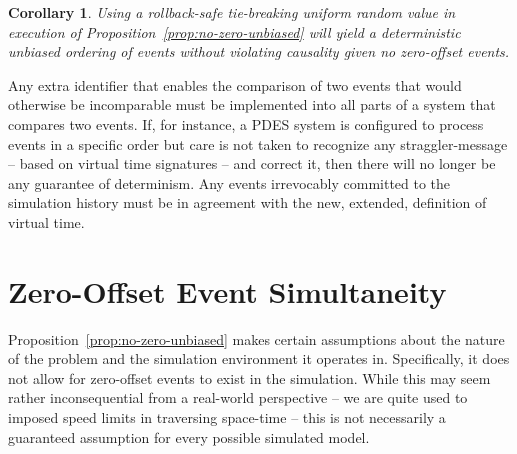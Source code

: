 \documentclass[nonacm,sigconf]{acmart}
\newtheorem{corollary}{Corollary}
\begin{document}

\begin{corollary}
  Using a rollback-safe tie-breaking uniform random value in execution of Proposition~\ref{prop:no-zero-unbiased} will yield a deterministic unbiased ordering of events without violating causality given no zero-offset events.
\end{corollary}



Any extra identifier that enables the comparison of two events that would otherwise be incomparable must be implemented into all parts of a system that compares two events. If, for instance, a PDES system is configured to process events in a specific order but care is not taken to recognize any straggler-message -- based on virtual time signatures -- and correct it, then there will no longer be any guarantee of determinism. Any events irrevocably committed to the simulation history must be in agreement with the new, extended, definition of virtual time.


\section{Zero-Offset Event Simultaneity}\label{sec:relaxing}
Proposition~\ref{prop:no-zero-unbiased} makes certain assumptions about the nature of the problem and the simulation environment it operates in. Specifically, it does not allow for zero-offset events to exist in the simulation. While this may seem rather inconsequential from a real-world perspective -- we are quite used to imposed speed limits in traversing space-time -- this is not necessarily a guaranteed assumption for every possible simulated model.
\end{document}
